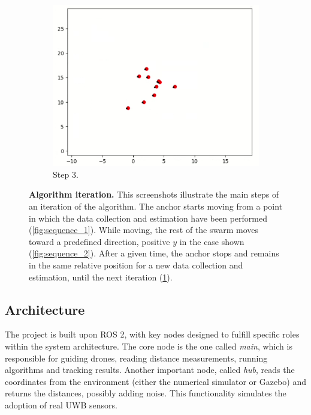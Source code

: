 \begin{figure}[!ht]
     \hfill%
      \begin{subfigure}[b]{0.28\textwidth}
         \centering
         \includegraphics[width=\textwidth]{figures/sequence_3.png}
         \caption{Step 3.}
         \label{fig:sequence_3}
     \end{subfigure}
     \hfill
     \caption[Algorithm iteration]{
        \textbf{Algorithm iteration.} 
        This screenshots illustrate the main steps of an iteration of the algorithm. The anchor starts moving from a point in which the data collection and estimation have been performed (\ref{fig:sequence_1}). While moving, the rest of the swarm moves toward a predefined direction, positive $y$ in the case shown (\ref{fig:sequence_2}). After a given time, the anchor stops and remains in the same relative position for a new data collection and estimation, until the next iteration (\ref{fig:sequence_3}). 
      }
     \label{fig:sequence}
\end{figure}


\subsection{Architecture}
The project is built upon ROS 2, with key nodes designed to fulfill specific roles within the system architecture.
The core node is the one called \textit{main}, which is responsible for guiding drones, reading distance measurements, running algorithms and tracking results. 
Another important node, called \textit{hub}, reads the coordinates from the environment (either the numerical simulator or Gazebo) and returns the distances, possibly adding noise. This functionality simulates the adoption of real UWB sensors. 

